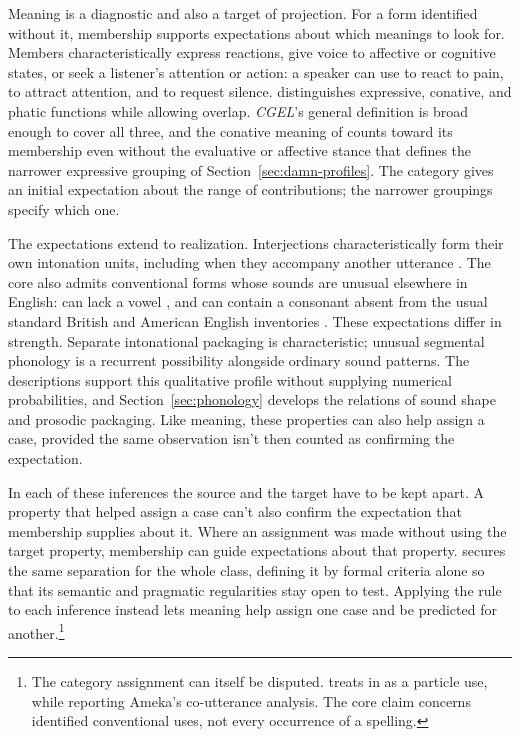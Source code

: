 \documentclass[12pt]{article}
\begin{document}
Meaning is a diagnostic and also a target of projection. For a form
identified without it, membership supports expectations about which
meanings to look for. Members characteristically express reactions, give
voice to affective or cognitive states, or seek a listener's attention or
action: a speaker can use  to react to pain, 
to attract attention, and  to request silence.
\textcite[113--115]{ameka1992} distinguishes expressive, conative, and
phatic functions while allowing overlap. \textit{CGEL}'s general definition
is broad enough to cover all three, and the conative meaning of 
counts toward its membership even without the evaluative or affective stance
that defines the narrower
expressive grouping of Section~\ref{sec:damn-profiles}. The category gives
an initial expectation about the range of contributions; the narrower
groupings specify which one.

The expectations extend to realization. Interjections characteristically
form their own intonation units, including when they accompany another
utterance \citep[108]{ameka1992}. The core also admits conventional forms
whose sounds are unusual elsewhere in English:  can lack a
vowel \citep[105--106]{ameka1992}, and  can contain a
consonant absent from the usual standard British and American English
inventories \citep[74, 853]{quirk1985}. These expectations differ in
strength. Separate intonational packaging is characteristic; unusual
segmental phonology is a recurrent possibility alongside ordinary sound
patterns. The descriptions support this qualitative profile without
supplying numerical probabilities, and Section~\ref{sec:phonology} develops
the relations of sound shape and prosodic packaging. Like meaning, these
properties can also help assign a case, provided the same observation isn't
then counted as confirming the expectation.

In each of these inferences the source and the target have to be kept
apart. A property that helped assign a case can't also confirm the
expectation that membership supplies about it. Where an assignment was
made without using the target property, membership can guide expectations
about that property. \textcite[124]{wilkins1992} secures the same separation
for the whole class, defining it by formal criteria alone so that its
semantic and pragmatic regularities stay open to test. Applying the rule to
each inference instead lets meaning help assign one case and be predicted
for another.\footnote{The category assignment can
itself be disputed. \textcite[126--127 n.~5]{wilkins1992} treats  in  as a particle use, while reporting Ameka's
co-utterance analysis. The core claim
concerns identified conventional uses, not every occurrence of a spelling.}
\end{document}
